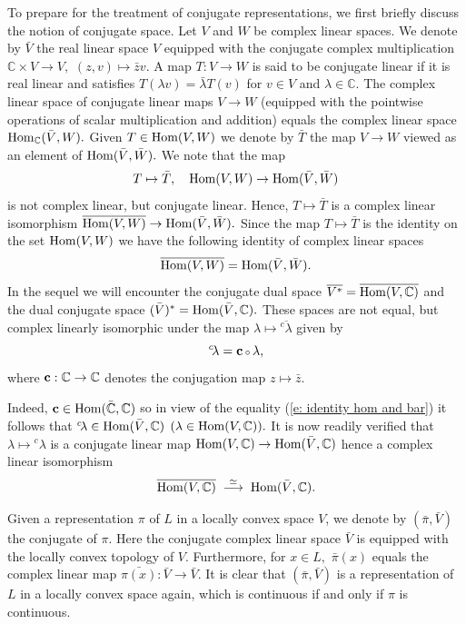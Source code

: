 \documentclass[12pt,a4paper]{article}
\def\msy#1{{\mathbb #1}}
\def\C{{\msy C}}
\def\gl{\lambda}
\def\to{\rightarrow}
\def\Hom{{\rm Hom}}
\def\after{\,{\scriptstyle\circ}\,}
\numberwithin{Thm}{section}
\numberwithin{equation}{section}
\numberwithin{equation}{section}
\begin{document}
To prepare for the treatment of conjugate representations, we first briefly discuss the notion
of conjugate space. Let $V$ and $W$ be complex linear spaces. We denote by $\bar V$
the real linear space $V$ equipped with the conjugate complex multiplication 
$\C \times V \to V,$ $ (z, v)\mapsto \bar z v.$ A map $T: V \to W$ is said
to be conjugate linear if it is real linear and satisfies $T(\gl v) = \bar\gl T(v)$ for $v \in V$ and $\gl\in \C.$ The complex linear space of conjugate linear maps 
$V \to W$ (equipped with the pointwise operations of scalar multiplication and addition) equals the complex linear space $\Hom_\C(\bar V, W).$ Given $T \in \Hom(V,W)$ we denote by 
$\bar T$ the map $V \to W$ viewed as an element of $\Hom(\bar V, \bar W).$ We note
that the map 
$$ 
T \mapsto \bar T, \quad \Hom(V,W) \to \Hom(\bar V, \bar W)
$$ 
is not complex
linear, but conjugate linear. Hence,  $T \mapsto \bar T$ is 
a complex linear isomorphism $\overline{\Hom(V,W)} \to \Hom(\bar V, \bar W).$ 
Since the map $T\mapsto \bar T$ is the identity on the set $\Hom(V,W)$ we have the following
identity of complex linear spaces 
\begin{equation}
\label{e: identity hom and bar}
\overline{\Hom(V,W)} = \Hom(\bar V, \bar W).
\end{equation} 
In the sequel we will encounter the conjugate dual space  $\overline{V^*} = \overline{\Hom(V,\C)}$ 
and  the dual conjugate space $(\bar V)^* = \Hom(\bar V, \C).$ These spaces
are not equal, but complex linearly isomorphic under the map $\gl \mapsto \overline{{}^c\! \gl}$ given 
by 
\begin{equation} 
\label{e: defi c gl}
{}^c \!\gl = {\bf c} \after \gl, 
\end{equation}
where ${\bf c}: \C \to \C$ denotes the conjugation
map $z \mapsto \bar z.$ 

Indeed, ${\bf c} \in \Hom(\bar \C, \C)$ so in view of the equality (\ref{e: identity hom and bar}) it follows that ${}^c\!\gl \in \Hom(\bar V, \C)$ $(\gl \in \Hom(V, \C)).$ 
It is now readily verified that $\gl \mapsto {}^c\!\gl$ 
is a conjugate linear map $\Hom(V, \C) \to \Hom(\bar V, \C)$ hence a complex linear
isomorphism
$$ 
\overline{\Hom(V, \C)}\;\; {\buildrel \simeq \over \longrightarrow}\;\;  \Hom(\bar V, \C).
$$ 

Given a representation $\pi$ of $L$ in a locally convex space $V$,
we denote by $(\bar \pi, \bar V)$ the conjugate of $\pi.$ Here the conjugate complex
linear space $\bar V$ is equipped
with the locally convex topology of $V.$  
 Furthermore, for $x \in L,$ 
$\bar \pi(x)$ equals the complex linear map $\bar {\pi(x)}: \bar V \to \bar V.$ 
It is clear that $(\bar \pi, \bar V)$ is a representation of $L$ in a locally convex 
space again, which is continuous if and only if $\pi$ is continuous.
\end{document}
